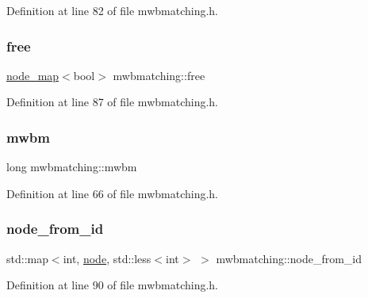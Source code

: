 Definition at line 82 of file mwbmatching.\+h.

\mbox{\label{classmwbmatching_a109911f7997e2f1b3293e505deb4a4cb}} 
\subsubsection{\texorpdfstring{free}{free}}
{\footnotesize\ttfamily \mbox{\hyperlink{classnode__map}{node\+\_\+map}}$<$bool$>$ mwbmatching\+::free\hspace{0.3cm}{\ttfamily [protected]}}



Definition at line 87 of file mwbmatching.\+h.

\mbox{\label{classmwbmatching_a80e73b4ab7162ea265c48a93199fc172}} 
\subsubsection{\texorpdfstring{mwbm}{mwbm}}
{\footnotesize\ttfamily long mwbmatching\+::mwbm\hspace{0.3cm}{\ttfamily [protected]}}



Definition at line 66 of file mwbmatching.\+h.

\mbox{\label{classmwbmatching_a805077195aac6c443b753b74da814c6f}} 
\subsubsection{\texorpdfstring{node\+\_\+from\+\_\+id}{node\_from\_id}}
{\footnotesize\ttfamily std\+::map$<$int, \mbox{\hyperlink{classnode}{node}}, std\+::less$<$int$>$ $>$ mwbmatching\+::node\+\_\+from\+\_\+id\hspace{0.3cm}{\ttfamily [protected]}}



Definition at line 90 of file mwbmatching.\+h.

\mbox{\label{classmwbmatching_ac44514154909580323c5d2e5c58e7d23}} 
